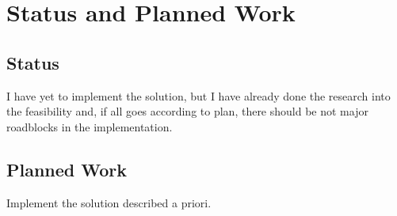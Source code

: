 \chapter{Status and Planned Work}
\label{chapter:status-planned-work}

\section{Status}
\label{sec:status}

I have yet to implement the solution, but I have already done the research into the feasibility and,
if all goes according to plan, there should be not major roadblocks in the implementation.

\section{Planned Work}
\label{sec:planned-work}

Implement the solution described a priori.